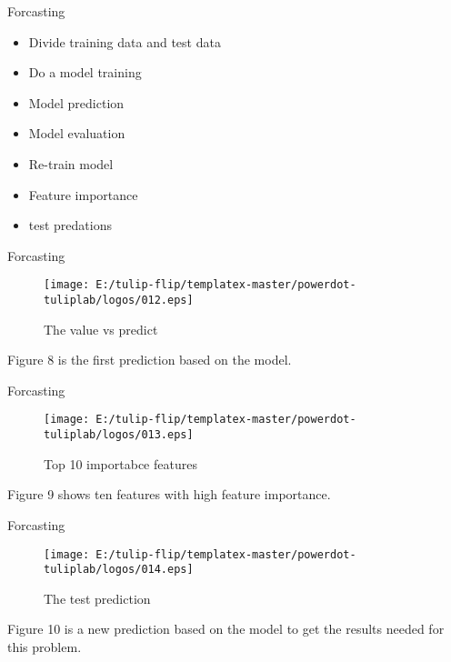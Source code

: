 \documentclass[
 size=12pt,
 paper=smartboard, %
 mode=present, %
 display=slides, %
style=tuliplab,
pauseslide,
fleqn,leqno]{powerdot}
\begin{document}
\begin{slide}[toc=,bm=]{Forcasting}
\begin{itemize}
  \item Divide training data and test data
  \item Do a model training
  \item Model prediction
  \item Model evaluation
  \item Re-train model
  \item Feature importance
  \item test predations
\end{itemize}
\end{slide}

\begin{slide}[toc=,bm=]{Forcasting}
  \begin{figure}[ht]%
    \centering%
    \texttt{[image: E:/tulip-flip/templatex-master/powerdot-tuliplab/logos/012.eps]}
    \caption{The value vs predict}%
    \end{figure}
\vspace{1cm}
Figure 8 is the first prediction based on the model.
\end{slide}

\begin{slide}[toc=,bm=]{Forcasting}
  \begin{figure}[ht]%
    \centering%
    \texttt{[image: E:/tulip-flip/templatex-master/powerdot-tuliplab/logos/013.eps]}
    \caption{Top 10 importabce features}%
    \end{figure}
\vspace{1cm}
Figure 9 shows ten features with high feature importance.
\end{slide}


\begin{slide}[toc=,bm=]{Forcasting}
  \begin{figure}[ht]%
    \centering%
    \texttt{[image: E:/tulip-flip/templatex-master/powerdot-tuliplab/logos/014.eps]}
    \caption{The test prediction}%
    \end{figure}
\vspace{1cm}
Figure 10 is a new prediction based on the model to get the results needed for this problem.
\end{slide}
\end{document}
